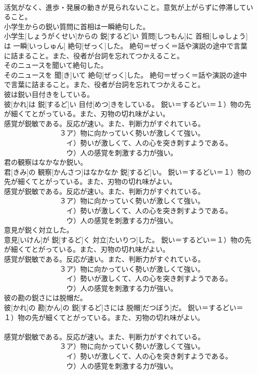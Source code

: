 \documentclass[8pt]{extreport}
\begin{document}
\begin{CJK}{UTF8}{min}
{\\	活気がなく、進歩・発展の動きが見られないこと。意気が上がらずに停滞していること。
\\	小学生からの鋭い質問に首相は一瞬絶句した。	
\\	小学生[しょうがくせい]からの 鋭[するど]い 質問[しつもん]に 首相[しゅしょう]は 一瞬[いっしゅん] 絶句[ぜっく]した。	絶句＝ぜっく＝話や演説の途中で言葉に詰まること。また、役者が台詞を忘れてつかえること。
\\	そのニュースを聞いて絶句した。	
\\	そのニュースを 聞[き]いて 絶句[ぜっく]した。	絶句＝ぜっく＝話や演説の途中で言葉に詰まること。また、役者が台詞を忘れてつかえること。
\\	彼は鋭い目付きをしている。	
\\	彼[かれ]は 鋭[するど]い 目付[めつ]きをしている。	鋭い＝するどい＝１）物の先が細くてとがっている。また、刃物の切れ味がよい。 　　　　　　　　
\\	感覚が鋭敏である。反応が速い。また、判断力がすぐれている。 　　　　　　　　３ア）物に向かっていく勢いが激しくて強い。 　　　　　　　　　イ）勢いが激しくて、人の心を突き刺すようである。 　　　　　　　　　ウ）人の感覚を刺激する力が強い。
\\	君の観察はなかなか鋭い。	
\\	君[きみ]の 観察[かんさつ]はなかなか 鋭[するど]い。	鋭い＝するどい＝１）物の先が細くてとがっている。また、刃物の切れ味がよい。 　　　　　　　　
\\	感覚が鋭敏である。反応が速い。また、判断力がすぐれている。 　　　　　　　　３ア）物に向かっていく勢いが激しくて強い。 　　　　　　　　　イ）勢いが激しくて、人の心を突き刺すようである。 　　　　　　　　　ウ）人の感覚を刺激する力が強い。
\\	意見が鋭く対立した。	
\\	意見[いけん]が 鋭[するど]く 対立[たいりつ]した。	鋭い＝するどい＝１）物の先が細くてとがっている。また、刃物の切れ味がよい。 　　　　　　　　
\\	感覚が鋭敏である。反応が速い。また、判断力がすぐれている。 　　　　　　　　３ア）物に向かっていく勢いが激しくて強い。 　　　　　　　　　イ）勢いが激しくて、人の心を突き刺すようである。 　　　　　　　　　ウ）人の感覚を刺激する力が強い。
\\	彼の勘の鋭さには脱帽だ。	
\\	彼[かれ]の 勘[かん]の 鋭[するど]さには 脱帽[だつぼう]だ。	鋭い＝するどい＝１）物の先が細くてとがっている。また、刃物の切れ味がよい。 　　　　　　　　
\\	感覚が鋭敏である。反応が速い。また、判断力がすぐれている。 　　　　　　　　３ア）物に向かっていく勢いが激しくて強い。 　　　　　　　　　イ）勢いが激しくて、人の心を突き刺すようである。 　　　　　　　　　ウ）人の感覚を刺激する力が強い。
}
\end{CJK}
\end{document}
